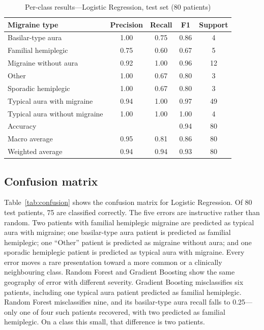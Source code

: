 \documentclass[conference]{IEEEtran}
\begin{document}
\begin{table}[t]
\centering
\caption{Per-class results---Logistic Regression, test set (80 patients)}
\label{tab:perclass}
\begin{tabular}{lcccc}
\toprule
Migraine type & Precision & Recall & F1 & Support \\
\midrule
Basilar-type aura & 1.00 & 0.75 & 0.86 & 4 \\
Familial hemiplegic & 0.75 & 0.60 & 0.67 & 5 \\
Migraine without aura & 0.92 & 1.00 & 0.96 & 12 \\
Other & 1.00 & 0.67 & 0.80 & 3 \\
Sporadic hemiplegic & 1.00 & 0.67 & 0.80 & 3 \\
Typical aura with migraine & 0.94 & 1.00 & 0.97 & 49 \\
Typical aura without migraine & 1.00 & 1.00 & 1.00 & 4 \\
\midrule
Accuracy & & & 0.94 & 80 \\
Macro average & 0.95 & 0.81 & 0.86 & 80 \\
Weighted average & 0.94 & 0.94 & 0.93 & 80 \\
\bottomrule
\end{tabular}
\end{table}

\subsection{Confusion matrix}
Table~\ref{tab:confusion} shows the confusion matrix for Logistic Regression. Of 80 test patients, 75 are classified correctly. The five errors are instructive rather than random. Two patients with familial hemiplegic migraine are predicted as typical aura with migraine; one basilar-type aura patient is predicted as familial hemiplegic; one ``Other'' patient is predicted as migraine without aura; and one sporadic hemiplegic patient is predicted as typical aura with migraine. Every error moves a rare presentation toward a more common or a clinically neighbouring class. Random Forest and Gradient Boosting show the same geography of error with different severity. Gradient Boosting misclassifies six patients, including one typical aura patient predicted as familial hemiplegic. Random Forest misclassifies nine, and its basilar-type aura recall falls to 0.25---only one of four such patients recovered, with two predicted as familial hemiplegic. On a class this small, that difference is two patients.
\end{document}
